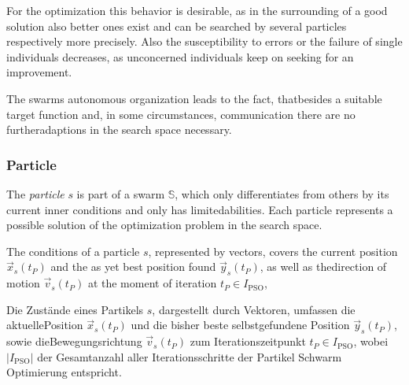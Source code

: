   For the optimization this behavior is desirable, as in the surrounding of a good solution also better ones exist and can be searched by several particles respectively more precisely. Also the susceptibility to errors or the failure of single individuals decreases, as unconcerned individuals keep on seeking for an improvement.
 
  The swarms autonomous organization leads to the fact, that\linebreak besides a suitable target function and, in some circumstances, communication there are no further\linebreak adaptions in the search space necessary. \cite{Eberhart2001}
 
\subsubsection{Particle}\label{Particle Description}
  The \textit{particle} $s$ is part of a swarm $\mathbb{S}$, which only differentiates from others by its current inner conditions and only has limited\linebreak abilities. Each particle represents a possible solution of the \linebreak optimization problem in the search space. \cite{Eberhart2001}

  The conditions of a particle $s$, represented by vectors, covers the current \linebreak position $\vec{x}_s(t_P)$ and the as yet best position found $\vec{y}_s(t_P)$, as well as the\linebreak direction of motion $\vec{v}_s(t_P)$ at the moment of iteration $t_P\in I_\textrm{PSO}$, 
  
  Die Zustände eines Partikels $s$, dargestellt durch Vektoren, umfassen die aktuelle\linebreak Position $\vec{x}_s(t_P)$ und die bisher beste selbstgefundene Position $\vec{y}_s(t_P)$, sowie die\linebreak Bewegungsrichtung $\vec{v}_s(t_P)$ zum Iterationszeitpunkt $t_P\in I_\textrm{PSO}$, wobei $|I_\textrm{PSO}|$ der Gesamtanzahl aller Iterationsschritte der Partikel Schwarm Optimierung entspricht.

